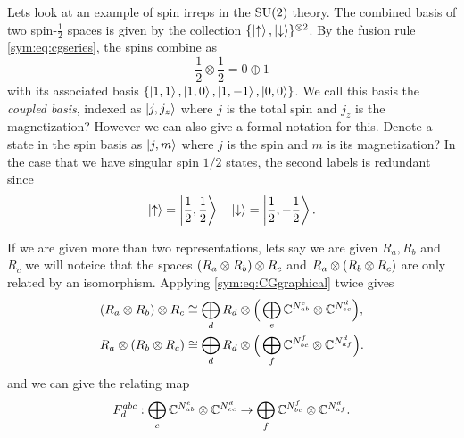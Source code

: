 \begin{example}
  Lets look at an example of spin irreps in the $\mathrm{SU}(2)$ theory. The combined
  basis of two spin-$\frac{1}{2}$ spaces is given by the collection
  $\{\left| \uparrow \right\rangle, \left| \downarrow \right\rangle\}^{\otimes 2}$. By the fusion rule
  \cref{sym:eq:cgseries}, the spins combine as
  \[
    \frac{1}{2} \otimes \frac{1}{2} = 0 \oplus 1 
  \]
  with its associated basis $\{\left| 1,1 \right\rangle,\left| 1,0 \right\rangle,\left| 1,-1 \right\rangle,\left| 0,0 \right\rangle\}$. We
  call this basis the \emph{coupled basis}, indexed as $\left| j,j_z \right\rangle$ where $j$
  is the total spin and $j_z$ is the magnetization? 
  However we can also give a formal notation for this. Denote a state in the
  spin basis as $\left| j,m \right\rangle$ where $j$ is the spin and $m$ is its magnetization?
  In the case that we have singular spin $1/2$ states, the second labels is
  redundant since
  \[
    \left| \uparrow \right\rangle = \left| \frac{1}{2}, \frac{1}{2} \right\rangle \quad \left| \downarrow \right\rangle = \left| \frac{1}{2}, -\frac{1}{2} \right\rangle.
  \]
\end{example}

If we are given more than two representations, lets say we are given $R_a, R_b$
and $R_c$ we will noteice that the spaces $(R_a \otimes R_b) \otimes R_c$ and $R_a \otimes
(R_b \otimes R_c)$ are only related by an isomorphism. 
Applying \cref{sym:eq:CGgraphical} twice gives
\begin{align*}
  (R_a \otimes R_b) \otimes R_c &\cong \bigoplus_{d} R_d \otimes
    \Big( \bigoplus_{e} \mathbb{C}^{N_{ab}^e} \otimes \mathbb{C}^{N_{ec}^d} \Big),\\
  R_a \otimes (R_b \otimes R_c) &\cong \bigoplus_{d} R_d \otimes
    \Big( \bigoplus_{f} \mathbb{C}^{N_{bc}^f} \otimes \mathbb{C}^{N_{af}^d} \Big).
\end{align*}
and we can give the relating map
\begin{equation}
  F^{abc}_d : \bigoplus_{e} \mathbb{C}^{N_{ab}^e} \otimes \mathbb{C}^{N_{ec}^d}
    \to \bigoplus_{f} \mathbb{C}^{N_{bc}^f} \otimes \mathbb{C}^{N_{af}^d}.
\end{equation}

